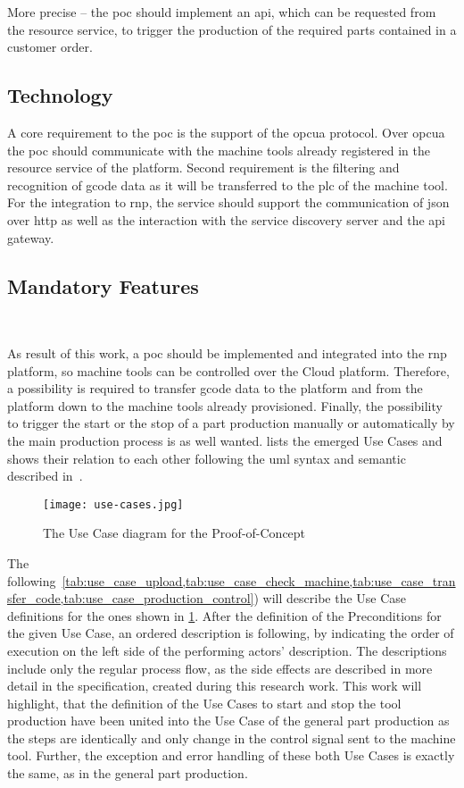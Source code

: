 \documentclass[
a4paper,
twoside,
headsepline,
cleardoublepage=empty,
parskip=half,
draft=false
]{scrbook}
\begin{document}
				More precise -- the \gls{poc} should implement an \gls{api}, which can be requested from the resource service, to trigger the production of the required parts contained in a customer order.

			\subsection{Technology} \label{subsec:technology}

				A core requirement to the \gls{poc} is the support of the \gls{opcua} protocol.
				Over \gls{opcua} the \gls{poc} should communicate with the machine tools already registered in the resource service of the platform.
				Second requirement is the filtering and recognition of \gls{gcode} data as it will be transferred to the \gls{plc} of the machine tool.
				For the integration to \gls{rnp}, the service should support the communication of \gls{json} over \gls{http} as well as the interaction with the service discovery server and the \gls{api} gateway.

			\subsection{Mandatory Features} \label{subsec:mandatory}

				As result of this work, a \gls{poc} should be implemented and integrated into the \gls{rnp} platform, so machine tools can be controlled over the Cloud platform.
				Therefore, a possibility is required to transfer \gls{gcode} data to the platform and from the platform down to the machine tools already provisioned.
				Finally, the possibility to trigger the start or the stop of a part production manually or automatically by the main production process is as well wanted.  lists the emerged Use Cases and shows their relation to each other following the \gls{uml} syntax and semantic described in~\cite{uml2017}.

				\begin{figure}[htbp]
					\centering
					\texttt{[image: use-cases.jpg]}
					\caption{The Use Case diagram for the Proof-of-Concept}
					\label{fig:use_cases}
				\end{figure}

				The following~\cref{tab:use_case_upload,tab:use_case_check_machine,tab:use_case_transfer_code,tab:use_case_production_control}) will describe the Use Case definitions for the ones shown in \cref{fig:use_cases}.
				After the definition of the Preconditions for the given Use Case, an ordered description is following, by indicating the order of execution on the left side of the performing actors' description.
				The descriptions include only the regular process flow, as the side effects are described in more detail in the specification, created during this research work. This work will highlight, that the definition of the Use Cases to start and stop the tool production have been united into the Use Case of the general part production as the steps are identically and only change in the control signal sent to the machine tool. Further, the exception and error handling of these both Use Cases is exactly the same, as in the general part production.
				
\end{document}
